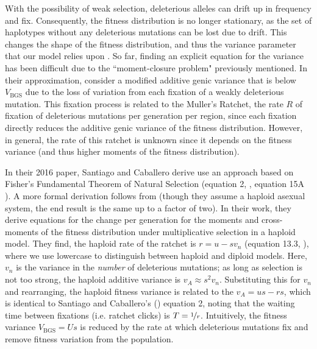 \documentclass[11pt]{article}
\begin{document}
With the possibility of weak selection, deleterious alleles can drift up in
frequency and fix. Consequently, the fitness distribution is no longer
stationary, as the set of haplotypes without any deleterious mutations can be
lost due to drift. This changes the shape of the fitness distribution, and thus
the variance parameter that our model relies upon
\parencite{Gessler1995-hz,OFallon2010-my,Good2013-lp,Haigh1978-gt,Higgs1995-xc}.
So far, finding an explicit equation for the variance has been difficult due to
the ``moment-closure problem" previously mentioned. In their approximation,
\textcite{Santiago2016-mu} consider a modified additive genic variance that is
below $V_\text{BGS}$ due to the loss of variation from each fixation of a
weakly deleterious mutation. This fixation process is related to the Muller's
Ratchet, the rate $R$ of fixation of deleterious mutations per generation per
region, since each fixation directly reduces the additive genic variance of the
fitness distribution. However, in general, the rate of this ratchet is unknown
since it depends on the fitness variance (and thus higher moments of the
fitness distribution).


In their 2016 paper, Santiago and Caballero derive use an approach based on
Fisher's Fundamental Theorem of Natural Selection (equation 2,
\cite{Santiago2016-mu}, equation 15A \cite{Garcia-Dorado2007-jj}). A more
formal derivation follows from \textcite{Higgs1995-xc} (though they assume a
haploid asexual system, the end result is the same up to a factor of two). In
their work, they derive equations for the change per generation for the moments
and cross-moments of the fitness distribution under multiplicative selection in
a haploid model. They find, the haploid rate of the ratchet is $r = u - s v_n$
(equation 13.3, \cite{Higgs1995-xc}), where we use lowercase to distinguish
between haploid and diploid models. Here, $v_n$ is the variance in the
\emph{number} of deleterious mutations; as long as selection is not too strong,
the haploid additive variance is $v_{A} \approx s^2 v_n$. Substituting this for
$v_n$ and rearranging, the haploid fitness variance is related to the $v_A = us
- rs$, which is identical to Santiago and Caballero's
(\citeyear{Santiago2016-mu}) equation 2, noting that the waiting time between
fixations (i.e. ratchet clicks) is $T = \nicefrac{1}{r}$. Intuitively, the
fitness variance $V_\text{BGS} = Us$ is reduced by the rate at which
deleterious mutations fix and remove fitness variation from the population.
\end{document}
